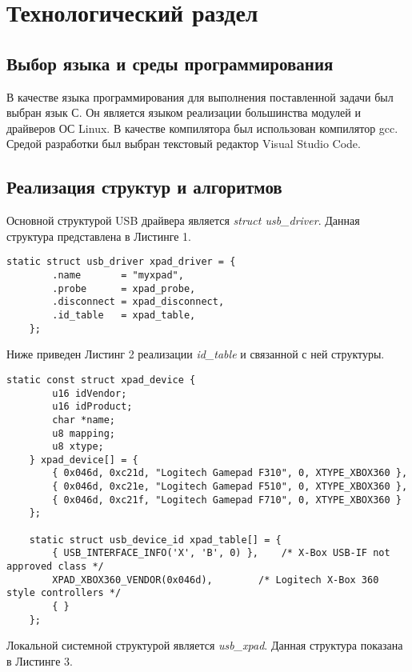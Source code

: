 \section{Технологический раздел}

\subsection{Выбор языка и среды программирования}
В качестве языка программирования для выполнения поставленной
задачи был выбран язык С. Он является языком реализации большинства
модулей и драйверов ОС Linux. В качестве компилятора был использован
компилятор gcc. Средой разработки был выбран текстовый редактор
Visual Studio Code.

\subsection{Реализация структур и алгоритмов}
Основной структурой USB драйвера является \textit{struct usb\_driver}. Данная структура представлена в Листинге 1.

\begin{lstlisting}[caption=Структура usb\_driver]
	static struct usb_driver xpad_driver = {
		.name		= "myxpad",
		.probe		= xpad_probe,
		.disconnect	= xpad_disconnect,
		.id_table	= xpad_table,
	};
\end{lstlisting}

Ниже приведен Листинг 2 реализации \textit{id\_table} и связанной с ней структуры.
\begin{lstlisting}[caption=Структуры xpad\_device и функция xpad\_table]
	static const struct xpad_device {
		u16 idVendor;
		u16 idProduct;
		char *name;
		u8 mapping;
		u8 xtype;
	} xpad_device[] = {
		{ 0x046d, 0xc21d, "Logitech Gamepad F310", 0, XTYPE_XBOX360 },
		{ 0x046d, 0xc21e, "Logitech Gamepad F510", 0, XTYPE_XBOX360 },
		{ 0x046d, 0xc21f, "Logitech Gamepad F710", 0, XTYPE_XBOX360 }
	};
	
	static struct usb_device_id xpad_table[] = {
		{ USB_INTERFACE_INFO('X', 'B', 0) },	/* X-Box USB-IF not approved class */
		XPAD_XBOX360_VENDOR(0x046d),		/* Logitech X-Box 360 style controllers */
		{ }
	};
\end{lstlisting}

Локальной системной структурой является \textit{usb\_xpad}. Данная структура показана в Листинге 3.

